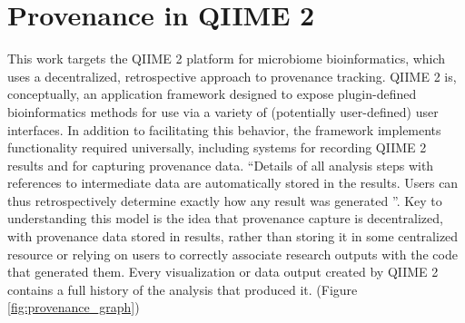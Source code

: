 \section{Provenance in QIIME 2}

This work targets the QIIME 2 platform for microbiome bioinformatics, which
uses a decentralized, retrospective approach to provenance tracking. QIIME 2 is,
conceptually, an application framework designed to expose plugin-defined
bioinformatics methods for use via a variety of (potentially user-defined) user
interfaces. In addition to facilitating this behavior, the framework implements
functionality required universally, including systems for recording QIIME 2
results and for capturing provenance data. “Details of all analysis steps with
references to intermediate data are automatically stored in the results. Users
can thus retrospectively determine exactly how any result was generated \parencite[854]{bolyen_reproducible_2019}”.
Key to understanding this model is the idea that provenance capture is
decentralized, with provenance data stored in results, rather than storing it in
some centralized resource or relying on users to correctly associate research
outputs with the code that generated them. Every visualization or data output
created by QIIME 2 contains a full history of the analysis that produced it.
(Figure \ref{fig:provenance_graph})

